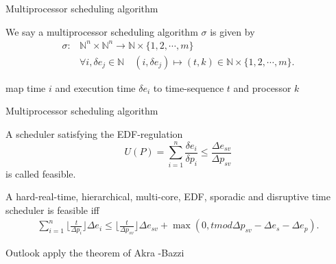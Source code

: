 \documentclass{beamer}
\begin{document}
	
	\begin{frame}{Multiprocessor scheduling algorithm}	
	\begin{definition}
We say a multiprocessor scheduling algorithm $\sigma$ is given by 
	\begin{align} 
	\sigma: &\mathbb{N}^n \times \mathbb{N}^n \longrightarrow  \mathbb{N} \times \{1,2,\cdots, m\} \\
	&\forall i, \delta e_j \in  \mathbb{N} \quad (i ,\delta e_j)  \mapsto (t,k) \in \mathbb{N}\times \{1,2,\cdots,m\}. 
	\end{align}
\end{definition}
  map time $i$ and execution time $\delta e_i$ to time-sequence $t$ and processor $k$ 		
 	\end{frame}
 	
 	
 	\begin{frame}{Multiprocessor scheduling algorithm}
 	
\begin{definition} A scheduler satisfying the EDF-regulation 
	\begin{equation}
	U(P) = \sum\limits_{i=1}^n \frac{\delta e_i}{\delta p_i} \leq 		\frac{\Delta e_{sv}}{\Delta p_{sv}}
	\end{equation}
	is called feasible.
\end{definition}	


 	\begin{theorem}
		A hard-real-time, hierarchical, multi-core, EDF, sporadic and disruptive time scheduler is feasible iff 
			\begin{align}
	\sum_{i=1}^n \lfloor \frac{t}{\Delta p_i} \rfloor \Delta e_i \leq \lfloor  \frac{t}{\Delta p_{sv}} \rfloor \Delta e_{sv} + \max (0,t  mod \Delta p_{sv} -\Delta e_{s} -\Delta e_p).
			\end{align}
		\end{theorem}
	\end{frame}
 	
 	

 	


	\begin{frame}{Outlook}
	apply the theorem of Akra -Bazzi
    	
	\end{frame}

	
	
	
\end{document}
